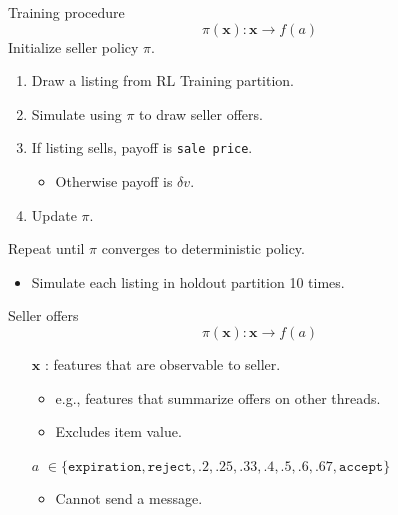 \documentclass[aspectratio=169]{beamer}
\begin{document}
\begin{frame}{Training procedure}
	\[\pi(\boldsymbol{x}): \boldsymbol{x} \rightarrow f(a)\]
	Initialize seller policy $\pi$.
	\begin{enumerate}
		\item Draw a listing from RL Training partition.
		\item Simulate using $\pi$ to draw seller offers.
		\item If listing sells, payoff is \texttt{sale price}.
		\begin{itemize}
			\item Otherwise payoff is $\delta v$.
		\end{itemize}
		\item Update $\pi$.
	\end{enumerate}
	\vspace{5mm}
	Repeat until $\pi$ converges to deterministic policy.
	\begin{itemize}
		\item Simulate each listing in holdout partition 10 times.
	\end{itemize}
\end{frame}

\begin{frame}{Seller offers}
	\[\pi(\boldsymbol{x}): \boldsymbol{x} \rightarrow f(a)\]
	\begin{itemize}
		\item[$\boldsymbol{x}$]: features that are observable to seller.
		\begin{itemize}
			\item e.g., features that summarize offers on other threads.
			\item Excludes item value.
		\end{itemize}
		\vspace{5mm}
		\item[$a$] $\in \{\texttt{expiration}, \texttt{reject}, .2, .25, .33, .4, .5, .6, .67, \texttt{accept}\}$
		\begin{itemize}
			\item Cannot send a message.
		\end{itemize}	
	\end{itemize}
\end{frame}
\end{document}
